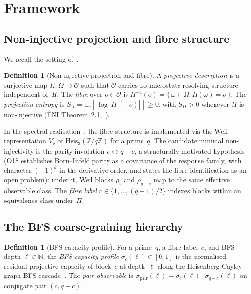 \documentclass[11pt,a4paper]{article}
\theoremstyle{plain}
\theoremstyle{definition}
\newtheorem{definition}[theorem]{Definition}
\theoremstyle{remark}
\newcommand{\Omegaspace}{\Omega}
\newcommand{\Obs}{\mathcal{O}}
\begin{document}
  \section{Framework}
  \label{sec:framework}

  \subsection{Non-injective projection and fibre structure}
    \label{sec:fibre}

    We recall the setting of~\cite{Beau2026l,Beau2026m}.

    \begin{definition}[Non-injective projection and fibre]
      \label{def:projection}
      A \emph{projective description} is a surjective map $\Pi : \Omegaspace \to \Obs$
      such that $\Obs$ carries no microstate-resolving structure independent of~$\Pi$.
      The \emph{fibre} over $o \in \Obs$ is
      $\Pi^{-1}(o) = \{\,\omega \in \Omegaspace : \Pi(\omega) = o\,\}$.
      The \emph{projection entropy} is
      $S_\Pi = \mathbb{E}_{o}[\,\log|\Pi^{-1}(o)|\,] \geq 0$,
      with $S_\Pi > 0$ whenever $\Pi$ is non-injective
      \textup{(ENI Theorem~2.1,~\cite{Beau2026l})}.
    \end{definition}

    In the spectral realisation~\cite{Beau2026m}, the fibre structure is implemented
    via the Weil representation $V_\rho$ of
    $\mathrm{Heis}_3(\mathbb{Z}/q\mathbb{Z})$ for a prime~$q$.
    The candidate minimal non-injectivity is the parity involution $c \leftrightarrow q - c$,
    a structurally motivated hypothesis (O18 establishes Born--Infeld parity as a covariance
    of the response family, with character $(-1)^{k}$ in the derivative order, and states the
    fibre identification as an open problem): under it, Weil blocks
    $\rho_c$ and $\rho_{q-c}$ map to the same effective observable class.
    The \emph{fibre label} $c \in \{1,\ldots,(q-1)/2\}$
    indexes blocks within an equivalence class under~$\Pi$.

  \subsection{The BFS coarse-graining hierarchy}
    \label{sec:bfs}

    \begin{definition}[BFS capacity profile]
      \label{def:bfs}
      For a prime~$q$, a fibre label~$c$, and BFS depth $\ell \in \mathbb{N}$,
      the \emph{BFS capacity profile} $\sigma_c(\ell) \in [0,1]$ is the normalised
      residual projective capacity of block~$c$ at depth~$\ell$ along the
      Heisenberg Cayley graph BFS cascade~\cite{Beau2026a16}.
      The \emph{pair observable} is
      $\sigma_{\mathrm{pair}}(\ell) = \sigma_c(\ell)\cdot\sigma_{q-c}(\ell)$
      on conjugate pair $(c,q-c)$.
    \end{definition}
\end{document}
